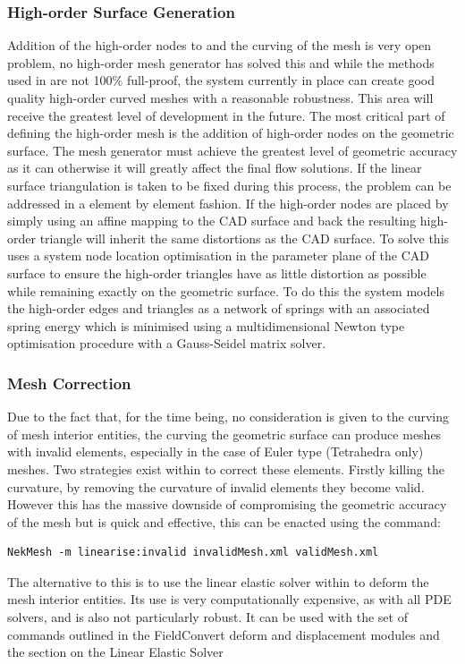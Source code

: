 \subsubsection{High-order Surface Generation}

Addition of the high-order nodes to and the curving of the mesh is very open
problem, no high-order mesh generator has solved this and while the methods
used in \mc are not 100\% full-proof, the system currently in place can create
good quality high-order curved meshes with a reasonable robustness. This area
will receive the greatest level of development in the future. The most critical
part of defining the high-order mesh is the addition of high-order nodes on the
geometric surface. The mesh generator must achieve the greatest level of
geometric accuracy as it can otherwise it will greatly affect the final flow
solutions. If the linear surface triangulation is taken to be fixed during this
process, the problem can be addressed in a element by element fashion. If the
high-order nodes are placed by simply using an affine mapping to the CAD surface
and back the resulting high-order triangle will inherit the same distortions as
the CAD surface. To solve this \mc uses a system node location optimisation in
the parameter plane of the CAD surface to ensure the high-order triangles have
as little distortion as possible while remaining exactly on the geometric
surface. To do this the system models the high-order edges and triangles as a
network of springs with an associated spring energy which is minimised using a
multidimensional Newton type optimisation procedure with a Gauss-Seidel matrix
solver.

\subsubsection{Mesh Correction}

Due to the fact that, for the time being, no consideration is given to the
curving of mesh interior entities, the curving the geometric surface can
produce meshes with invalid elements, especially in the case of Euler
type (Tetrahedra only) meshes. Two strategies exist within \nekpp to
correct these elements. Firstly killing the curvature, by removing the
curvature of invalid elements they become valid. However this has the
massive downside of compromising the geometric accuracy of the mesh but
is quick and effective, this can be enacted using the command:
\begin{lstlisting}[style=BashInputStyle]
    NekMesh -m linearise:invalid invalidMesh.xml validMesh.xml
\end{lstlisting}
%
The alternative to this is to use the linear elastic solver within \nekpp to
deform the mesh interior entities. Its use is very computationally expensive,
as with all PDE solvers, and is also not particularly robust. It can be used
with the set of commands outlined in the FieldConvert deform and displacement
modules and the section on the Linear Elastic Solver

